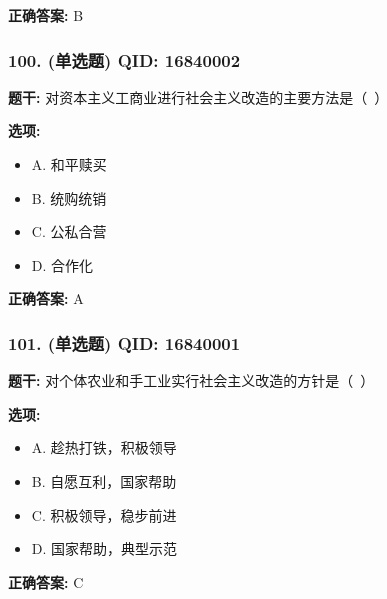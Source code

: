 \documentclass[12pt,UTF8]{ctexart}
\begin{document}
\textbf{正确答案:}
B

\vspace{0.3em}\hrulefill\vspace{0.7em}

\subsubsection*{100. (单选题) \small QID: 16840002}

\textbf{题干:}
对资本主义工商业进行社会主义改造的主要方法是（ ）

\textbf{选项:}
\begin{itemize}[leftmargin=*]

  \item A. 和平赎买

  \item B. 统购统销

  \item C. 公私合营

  \item D. 合作化

\end{itemize}

\textbf{正确答案:}
A

\vspace{0.3em}\hrulefill\vspace{0.7em}

\subsubsection*{101. (单选题) \small QID: 16840001}

\textbf{题干:}
对个体农业和手工业实行社会主义改造的方针是（ ）

\textbf{选项:}
\begin{itemize}[leftmargin=*]

  \item A. 趁热打铁，积极领导

  \item B. 自愿互利，国家帮助

  \item C. 积极领导，稳步前进

  \item D. 国家帮助，典型示范

\end{itemize}

\textbf{正确答案:}
C

\vspace{0.3em}\hrulefill\vspace{0.7em}
\end{document}
